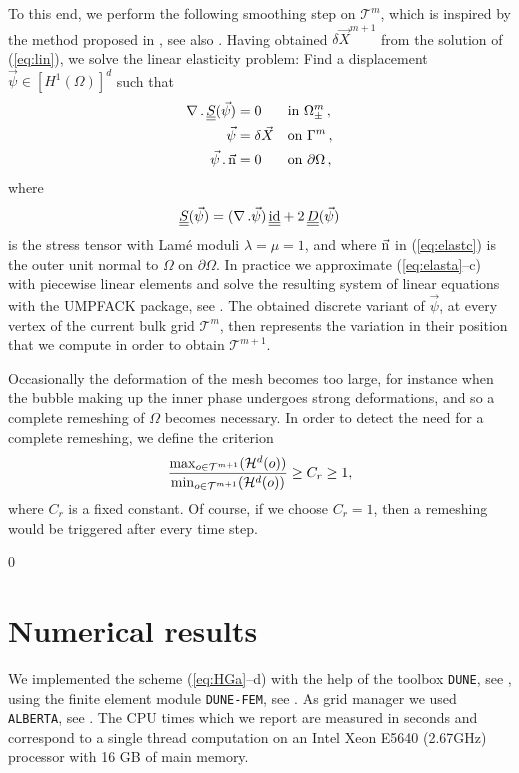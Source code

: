 \documentclass[a4paper,11pt,onecolumn]{article}
\newcommand{\sigmaO}{o}
\newcommand{\id}{\rm id}
\newcommand{\mat}[1]{\underline{\underline{#1}}\rule{0pt}{0pt}}
\begin{document}
To this end, we perform the following smoothing step on $\mathcal{T}^m$, which
is inspired by the method proposed in \cite{Ganesan06}, see also
\cite{GanesanT08}. Having obtained $\delta \vec X^{m+1}$ from the solution of
(\ref{eq:lin}), we solve the linear elasticity problem: Find a displacement
$\vec\psi \in [H^1(\Omega)]^d$ such that
\begin{subequations}
\begin{align}
\nabla\,.\,\mat S(\vec\psi) &= 0 && \mbox{in }\Omega_{\pm}^m\,,
\label{eq:elasta}\\
\vec\psi &= \delta \vec X && \mbox{on } \Gamma^m\,, \label{eq:elastb} \\
\vec\psi\,.\,\vec{\rm n} & = 0 &&\mbox{on } \partial\Omega\,, \label{eq:elastc}
\end{align}
\end{subequations}
where
\begin{equation} \label{eq:elasticity_tensor}
\mat S(\vec \psi) = (\nabla\,.\vec\psi)\,\mat\id + 2\,\mat D(\vec\psi)
\end{equation}
is the stress tensor with Lam{\'e} moduli $\lambda=\mu=1$, and where
$\vec{\rm n}$ in (\ref{eq:elastc}) is the outer unit normal to $\Omega$ on
$\partial\Omega$. In practice we approximate (\ref{eq:elasta}--c) with
piecewise linear elements and solve the resulting system of linear equations
with the UMPFACK package, see \cite{Davis04}. The obtained discrete variant of
$\vec\psi$, at every vertex of the current bulk grid $\mathcal{T}^m$, then
represents the variation in their position that we compute in order to obtain
$\mathcal{T}^{m+1}$.

Occasionally the deformation of the mesh becomes too large, for instance when
the bubble making up the inner phase undergoes strong deformations, and so a
complete remeshing of $\Omega$ becomes necessary. In order to detect the need
for a complete remeshing, we define the criterion
\begin{equation}\label{eq:remesh}
\frac{\max_{\sigmaO\in {\cal T}^{m+1}}(\mathcal{H}^{d}(\sigmaO))}
{\min_{\sigmaO\in\mathcal {T}^{m+1}}(\mathcal{H}^{d}(\sigmaO))} \geq C_r \geq 1,
\end{equation}
where $C_r$ is a fixed constant. Of course, if we choose $C_r = 1$, then a
remeshing would be triggered after every time step.

\setcounter{equation} 0
\section{Numerical results} \label{sec:4}
We implemented the scheme (\ref{eq:HGa}--d)
with the help of the toolbox \verb|DUNE|,
see \cite{dunegridpaperI08,dunegridpaperII08}, using the finite element module
\verb|DUNE-FEM|, see \cite{dunefempaper10}. As grid manager we used
\verb|ALBERTA|, see \cite{Alberta}. The CPU times which we report are measured
in seconds and correspond to a single thread computation on an Intel Xeon E5640
(2.67GHz) processor with 16 GB of main memory.
\end{document}
